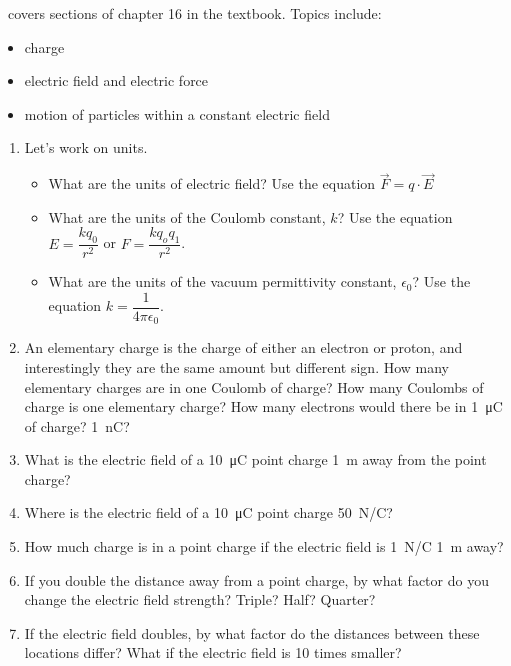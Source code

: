 \week \ covers sections of chapter 16 in the textbook. Topics include:

\begin{itemize}
	\item charge
	\item electric field and electric force
	\item motion of particles within a constant electric field
\end{itemize}

\begin{enumerate}
\setlength\itemsep{2 in}
	
\item Let's work on units.
\begin{itemize}
	\setlength\itemsep{1 in}
    \item What are the units of electric field? Use the equation $\vec{F}=q\cdot \vec{E}$
    \item What are the units of the Coulomb constant, $k$? Use the equation $E=\dfrac{k q_0}{r^2}$ or $F=\dfrac{k q_o q_1 }{r^2}$.
    \item What are the units of the vacuum permittivity constant, $\epsilon_0$? Use the equation $k=\dfrac{1}{4 \pi \epsilon_0}$.
\end{itemize}

\item
An elementary charge is the charge of either an electron or proton, and interestingly they are the same amount but different sign. How many elementary charges are in one Coulomb of charge? How many Coulombs of charge is one elementary charge? How many electrons would there be in \SI{1}{\micro\coulomb} of charge? \SI{1}{\nano\coulomb}?

\item 
What is the electric field of a \SI{10}{\micro\coulomb} point charge \SI{1}{\meter} away from the point charge? 

\item
Where is the electric field of a \SI{10}{\micro\coulomb} point charge \SI{50}{\newton/\coulomb}? 

\item 
How much charge is in a point charge if the electric field is \SI{1}{\newton/\coulomb} \SI{1}{\meter} away?

\item
If you double the distance away from a point charge, by what factor do you change the electric field strength? Triple? Half? Quarter? 

\item
If the electric field doubles, by what factor do the distances between these locations differ? What if the electric field is 10 times smaller?


\end{enumerate}
